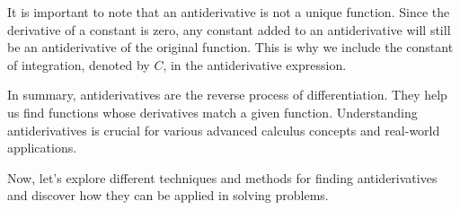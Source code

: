 It is important to note that an antiderivative is not a unique function. Since the derivative of a constant is zero, any constant added to an antiderivative will still be an antiderivative of the original function. This is why we include the constant of integration, denoted by $C$, in the antiderivative expression.

In summary, antiderivatives are the reverse process of differentiation. They help us find functions whose derivatives match a given function. Understanding antiderivatives is crucial for various advanced calculus concepts and real-world applications.

Now, let's explore different techniques and methods for finding antiderivatives and discover how they can be applied in solving problems.
